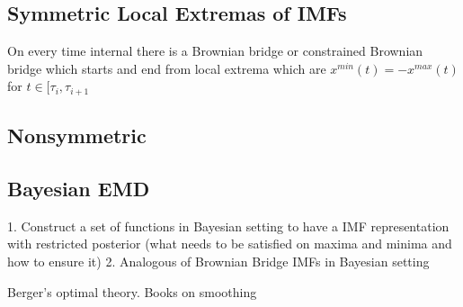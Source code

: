 \subsection{Symmetric Local Extremas of IMFs} 
On every time internal there is a Brownian bridge or constrained Brownian bridge which starts and end from local extrema which are $x^{min} (t)= -x^{max}(t)$ for $t \in [\tau_i,\tau_{i+1}$
\subsection{Nonsymmetric}

\subsection{Bayesian EMD}
1. Construct a set of functions in Bayesian setting to have a IMF representation with restricted posterior (what needs to be satisfied on maxima and minima and how to ensure it)
2. Analogous of Brownian Bridge IMFs in Bayesian setting

Berger's optimal theory. Books on smoothing